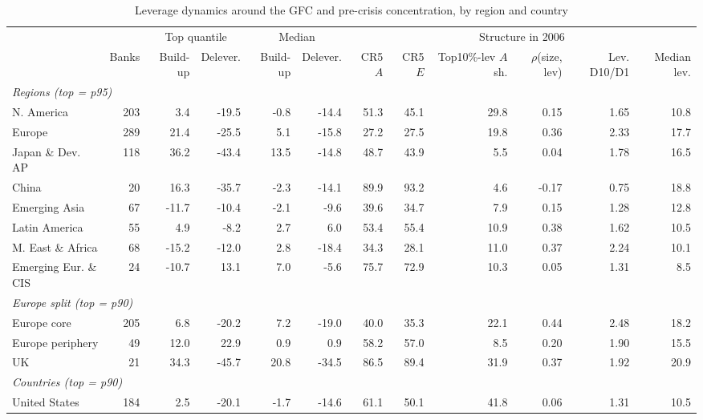 \begin{table}[htbp]
\centering
\footnotesize
\begin{threeparttable}
\caption{Leverage dynamics around the GFC and pre-crisis concentration, by region and country}
\label{tab:region_gfc}
\setlength{\tabcolsep}{4pt}
\begin{tabular}{lrrrrrrrrrrr}
\toprule
 & & \multicolumn{2}{c}{Top quantile} & \multicolumn{2}{c}{Median} & \multicolumn{6}{c}{Structure in 2006} \\
\cmidrule(lr){3-4}\cmidrule(lr){5-6}\cmidrule(lr){7-12}
 & Banks & Build-up & Delever. & Build-up & Delever. & CR5 $A$ & CR5 $E$ & Top10\%-lev $A$ sh. & $\rho$(size, lev) & Lev. D10/D1 & Median lev. \\
\midrule
\multicolumn{12}{l}{\textit{Regions (top = p95)}} \\
N. America & 203 & 3.4 & -19.5 & -0.8 & -14.4 & 51.3 & 45.1 & 29.8 & 0.15 & 1.65 & 10.8 \\
Europe & 289 & 21.4 & -25.5 & 5.1 & -15.8 & 27.2 & 27.5 & 19.8 & 0.36 & 2.33 & 17.7 \\
Japan \& Dev. AP & 118 & 36.2 & -43.4 & 13.5 & -14.8 & 48.7 & 43.9 & 5.5 & 0.04 & 1.78 & 16.5 \\
China & 20 & 16.3 & -35.7 & -2.3 & -14.1 & 89.9 & 93.2 & 4.6 & -0.17 & 0.75 & 18.8 \\
Emerging Asia & 67 & -11.7 & -10.4 & -2.1 & -9.6 & 39.6 & 34.7 & 7.9 & 0.15 & 1.28 & 12.8 \\
Latin America & 55 & 4.9 & -8.2 & 2.7 & 6.0 & 53.4 & 55.4 & 10.9 & 0.38 & 1.62 & 10.5 \\
M. East \& Africa & 68 & -15.2 & -12.0 & 2.8 & -18.4 & 34.3 & 28.1 & 11.0 & 0.37 & 2.24 & 10.1 \\
Emerging Eur. \& CIS & 24 & -10.7 & 13.1 & 7.0 & -5.6 & 75.7 & 72.9 & 10.3 & 0.05 & 1.31 & 8.5 \\
\multicolumn{12}{l}{\textit{Europe split (top = p90)}} \\
Europe core & 205 & 6.8 & -20.2 & 7.2 & -19.0 & 40.0 & 35.3 & 22.1 & 0.44 & 2.48 & 18.2 \\
Europe periphery & 49 & 12.0 & 22.9 & 0.9 & 0.9 & 58.2 & 57.0 & 8.5 & 0.20 & 1.90 & 15.5 \\
UK & 21 & 34.3 & -45.7 & 20.8 & -34.5 & 86.5 & 89.4 & 31.9 & 0.37 & 1.92 & 20.9 \\
\multicolumn{12}{l}{\textit{Countries (top = p90)}} \\
United States & 184 & 2.5 & -20.1 & -1.7 & -14.6 & 61.1 & 50.1 & 41.8 & 0.06 & 1.31 & 10.5 \\

\end{tabular}
\end{threeparttable}
\end{table}
